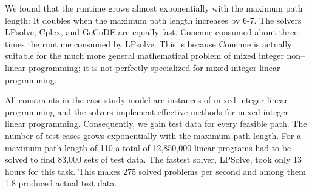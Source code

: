 \documentclass[runningheads,a4paper]{llncs}%
\begin{document}
We found that the runtime grows almost exponentially with the maximum path
length: It doubles when the maximum path length increases by $6$-$7$. The
solvers LPsolve, Cplex, and GeCoDE are equally fast. Couenne consumed about
three times the runtime consumed by LPsolve. This is because Couenne is actually
suitable for the much more general mathematical problem of mixed integer
non--linear programming; it is not perfectly specialized for mixed integer
linear programming.

All constraints in the case study model are instances of mixed integer linear
programming and the solvers implement effective methods for mixed integer linear
programming. Consequently, we gain test data for every feasible path. The number
of test cases grows exponentially with the maximum path length. For a maximum
path length of 110 a total of 12,850,000 linear programs had to be solved to
find 83,000 sets of test data. The fastest solver, LPSolve, took only 13 hours
for this task. This makes 275 solved problems per second and among them 1.8
produced actual test data.
\end{document}
